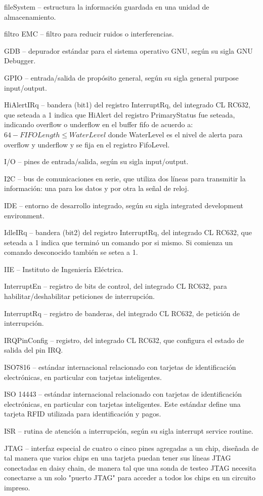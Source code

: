 \begin{glosario}
fileSystem – estructura la información guardada en una unidad de almacenamiento.

filtro EMC – filtro para reducir ruidos o interferencias.

GDB – depurador estándar para el sistema operativo GNU, según su sigla GNU Debugger.

GPIO – entrada/salida de propósito general, según su sigla general purpose input/output.

HiAlertIRq – bandera (bit1) del registro InterruptRq, del integrado CL RC632, que seteada a 1 indica que HiAlert del registro PrimaryStatus fue seteada, indicando overflow o underflow en el buffer fifo de acuerdo a: $64 - FIFOLength \leq WaterLevel $ donde WaterLevel es el nivel de alerta para overflow y underflow y se fija en el registro FifoLevel.

I/O – pines de entrada/salida, según su sigla input/output.

I2C – bus de comunicaciones en serie, que utiliza dos líneas para transmitir la información: una para los datos y por otra la señal de reloj.

IDE – entorno de desarrollo integrado, según su sigla integrated development environment.

IdleIRq – bandera (bit2) del registro InterruptRq, del integrado CL RC632, que seteada a 1 indica que terminó un comando por si mismo. Si comienza un comando desconocido también se setea a 1.

IIE – Instituto de Ingeniería Eléctrica.

InterruptEn – registro de bits de control, del integrado CL RC632, para habilitar/deshabilitar peticiones de interrupción.

InterruptRq – registro de banderas, del integrado CL RC632, de petición de interrupción.

IRQPinConfig – registro, del integrado CL RC632, que configura el estado de salida del pin IRQ.

ISO7816 – estándar internacional relacionado con tarjetas de identificación electrónicas, en particular con tarjetas inteligentes.

ISO 14443 – estándar internacional relacionado con tarjetas de identificación electrónicas, en particular con tarjetas inteligentes. Este estándar define una tarjeta RFID utilizada para identificación y pagos.

ISR – rutina de atención a interrupción, según su sigla interrupt service routine.

JTAG – interfaz especial de cuatro o cinco pines agregadas a un chip, diseñada de tal manera que varios chips en una tarjeta puedan tener sus líneas JTAG conectadas en daisy chain, de manera tal que una sonda de testeo JTAG necesita conectarse a un solo "puerto JTAG" para acceder a todos los chips en un circuito impreso.


\end{glosario}
